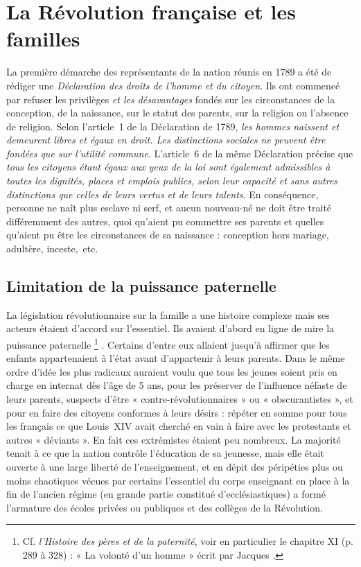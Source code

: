 

\chapter{La Révolution française et les familles}


 La première démarche des représentants de la nation réunis en 1789 a été de rédiger une \emph{Déclaration des droits de l'homme et du citoyen}. Ils ont commencé par refuser les privilèges \emph{et les désavantages} fondés sur les circonstances de la conception, de la naissance, sur le statut des parents, sur la religion ou l'absence de religion. Selon l'article~1 de la Déclaration de 1789, \emph{les hommes naissent et demeurent libres et égaux en droit. Les distinctions sociales ne peuvent être fondées que sur l'utilité commune}. L'article~6 de la même Déclaration précise que \emph{tous les citoyens étant égaux aux yeux de la loi sont également admissibles à toutes les dignités, places et emplois publics, selon leur capacité et sans autres distinctions que celles de leurs vertus et de leurs talents}. En conséquence, personne ne naît plus esclave ni serf, et aucun nouveau-né ne doit être traité différemment des autres, quoi qu'aient pu commettre ses parents et quelles qu'aient pu être les circonstances de sa naissance : conception hors mariage, adultère, inceste,~etc. 


\section{Limitation de la puissance paternelle}

 La législation révolutionnaire sur la famille a une histoire complexe mais ses acteurs étaient d'accord sur l'essentiel. Ils avaient d'abord en ligne de mire la puissance paternelle%
\footnote{Cf. \emph{l'Histoire des pères et de la paternité}, voir en particulier le chapitre XI (p. 289 à 328) : « La volonté d'un homme » écrit par Jacques .}%
. 
Certains d'entre eux allaient jusqu'à affirmer que les enfants appartenaient à l'état avant d'appartenir à leurs parents. Dans le même ordre d'idée les plus radicaux auraient voulu que tous les jeunes soient pris en charge en internat dès l'âge de 5 ans, pour les préserver de l'influence néfaste de leurs parents, suspects d'être « contre-révolutionnaires » ou « obscurantistes », et pour en faire des citoyens conformes à leurs désirs : répéter en somme pour tous les français ce que Louis~XIV avait cherché en vain à faire avec les protestants et autres « déviants ». En fait ces extrémistes étaient peu nombreux. La majorité tenait à ce que la nation contrôle l'éducation de sa jeunesse, mais elle était ouverte à une large liberté de l'enseignement, et en dépit des péripéties plus ou moins chaotiques vécues par certains l'essentiel du corps enseignant en place à la fin de l'ancien régime (en grande partie constitué d'ecclésiastiques) a formé l'armature des écoles privées ou publiques et des collèges de la Révolution.  

